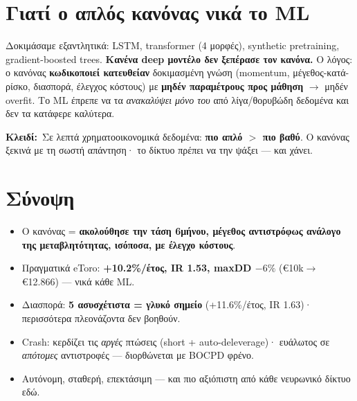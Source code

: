 \documentclass[11pt]{article}
\newcommand{\key}[1]{\par\medskip\noindent\colorbox{soft}{\parbox{\dimexpr\linewidth-2\fboxsep}{\textcolor{accent}{\textbf{Κλειδί:}}\ #1}}\par\medskip}
\begin{document}
\section{Γιατί ο απλός κανόνας νικά το ML}
Δοκιμάσαμε εξαντλητικά: LSTM, transformer (4 μορφές), synthetic pretraining, gradient-boosted trees.
\textbf{Κανένα deep μοντέλο δεν ξεπέρασε τον κανόνα.} Ο λόγος: ο κανόνας \textbf{κωδικοποιεί κατευθείαν}
δοκιμασμένη γνώση (momentum, μέγεθος-κατά-ρίσκο, διασπορά, έλεγχος κόστους) με \textbf{μηδέν παραμέτρους
προς μάθηση} $\to$ μηδέν overfit. Το ML έπρεπε να τα \emph{ανακαλύψει μόνο του} από λίγα/θορυβώδη δεδομένα
και δεν τα κατάφερε καλύτερα.
\key{Σε λεπτά χρηματοοικονομικά δεδομένα: \textbf{πιο απλό $>$ πιο βαθύ}. Ο κανόνας ξεκινά με τη σωστή
απάντηση· το δίκτυο πρέπει να την ψάξει --- και χάνει.}

\section{Σύνοψη}
\begin{itemize}[leftmargin=1.4em]
\item Ο κανόνας = \textbf{ακολούθησε την τάση 6μήνου, μέγεθος αντιστρόφως ανάλογο της μεταβλητότητας,
ισόποσα, με έλεγχο κόστους}.
\item Πραγματικά eToro: \textbf{+10.2\%/έτος, IR 1.53, maxDD $-6\%$} (€10k$\to$€12.866) --- νικά κάθε ML.
\item Διασπορά: \textbf{5 ασυσχέτιστα = γλυκό σημείο} (+11.6\%/έτος, IR 1.63)· περισσότερα πλεονάζοντα δεν
βοηθούν.
\item Crash: κερδίζει τις \emph{αργές} πτώσεις (short + auto-deleverage)· ευάλωτος σε \emph{απότομες}
αντιστροφές --- διορθώνεται με BOCPD φρένο.
\item Αυτόνομη, σταθερή, επεκτάσιμη --- και πιο αξιόπιστη από κάθε νευρωνικό δίκτυο εδώ.
\end{itemize}
\end{document}
